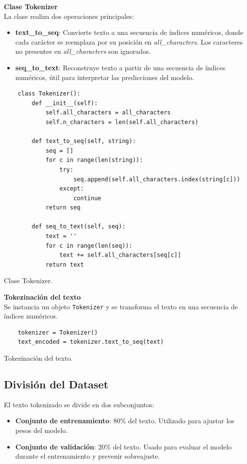 \documentclass{article}
\begin{document}
\textbf{\large{Clase Tokenizer}} \\

La clase realiza dos operaciones principales:
\begin{itemize}
    \item \textbf{text\_to\_seq}: Convierte texto a una secuencia de índices numéricos, donde cada carácter se reemplaza por su posición en \textit{all\_characters}. Los caracteres no presentes en \textit{all\_characters} son ignorados.
    \item \textbf{seq\_to\_text}: Reconstruye texto a partir de una secuencia de índices numéricos, útil para interpretar las predicciones del modelo.
\end{itemize}

\begin{listing}[H]
\begin{verbatim}
    class Tokenizer():
        def __init__(self):
            self.all_characters = all_characters
            self.n_characters = len(self.all_characters)

        def text_to_seq(self, string):
            seq = []
            for c in range(len(string)):
                try:
                    seq.append(self.all_characters.index(string[c]))
                except:
                    continue
            return seq

        def seq_to_text(self, seq):
            text = ''
            for c in range(len(seq)):
                text += self.all_characters[seq[c]]
            return text
\end{verbatim}
\caption{Clase Tokenizer.}
\end{listing}

\textbf{\large{Tokezinación del texto}} \\

Se instancia un objeto \texttt{Tokenizer} y se transforma el texto en una secuencia de índices numéricos.

\begin{listing}[H]
\begin{verbatim}
    tokenizer = Tokenizer()
    text_encoded = tokenizer.text_to_seq(text)
\end{verbatim}
\caption{Tokezinación del texto.}
\end{listing}

\newpage

\subsection{División del Dataset}
El texto tokenizado se divide en dos subconjuntos:
\begin{itemize}
    \item \textbf{Conjunto de entrenamiento}: 80\% del texto. Utilizado para ajustar los pesos del modelo.
    \item \textbf{Conjunto de validación}: 20\% del texto. Usado para evaluar el modelo durante el entrenamiento y prevenir sobreajuste.
\end{itemize}
\end{document}
